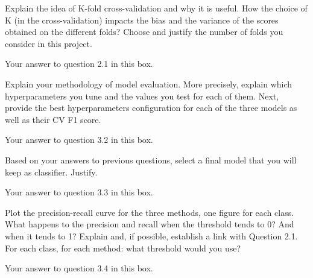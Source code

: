 
\begin{question}{3.1}
Explain the idea of K-fold cross-validation and why it is useful. How the choice of K (in the cross-validation) impacts the bias and the variance of the scores obtained on the different folds? Choose and justify the number of folds you consider in this project. 
\end{question}

\begin{answer}{12} 
    Your answer to question 2.1 in this box.\\
\end{answer}




\begin{question}{3.2}
Explain your methodology of model evaluation. More precisely, explain which hyperparameters you tune and the values you test for each of them. Next, provide the best hyperparameters configuration for each of the three models as well as their CV F1 score. 
\end{question}

\begin{answer}{14.5} 
    Your answer to question 3.2 in this box.\\
\end{answer}




\begin{question}{3.3}
Based on your answers to previous questions, select a final model that you will keep as classifier. Justify. 
\end{question}

\begin{answer}{2} 
    Your answer to question 3.3 in this box.\\
\end{answer}



\begin{question}{3.4}
Plot the precision-recall curve for the three methods, one figure for each class. What happens to the precision and recall when the threshold tends to 0? And when it tends to 1? Explain and, if possible, establish a link with Question 2.1.
For each class, for each method: what threshold would you use?  
\end{question}

\begin{answer}{18} 
    Your answer to question 3.4 in this box.\\
\end{answer}
